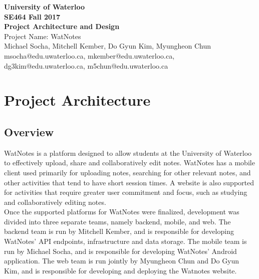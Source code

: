 \documentclass[12pt]{article}
\begin{document}
  \begin{center}
  \vspace*{\fill}
  {\Large\bf University of Waterloo}\\
  \vspace{3mm}
  {\large\bf SE464 Fall 2017}\\
  \vspace{3mm}
  {\Large\bf Project Architecture and Design}\\
  \vspace{5mm}
  {\Large Project Name: WatNotes}\\
  \vspace{5mm}
  Michael Socha, Mitchell Kember, Do Gyun Kim, Myungheon Chun\\
  \vspace{3mm}
  msocha@edu.uwaterloo.ca, mkember@edu.uwaterloo.ca, dg3kim@edu.uwaterloo.ca, m5chun@edu.uwaterloo.ca\\
  \vspace*{\fill}
  \end{center}

  \newpage

  \section{Project Architecture}
  \subsection{Overview}
    WatNotes is a platform designed to allow students at the University of Waterloo to effectively upload, share
    and collaboratively edit notes. WatNotes has a mobile client used primarily for uploading notes, searching for
    other relevant notes, and other activities that tend to have short session times.
    A website is also supported for activities that require greater user commitment and focus, such as studying and
    collaboratively editing notes. \\

    Once the supported platforms for WatNotes were finalized, development was divided into three separate teams, namely
    backend, mobile, and web. The backend team is run by Mitchell Kember, and is responsible for developing WatNotes' API
    endpoints, infrastructure and data storage. The mobile team is run by Michael Socha, and is responsible for developing
    WatNotes' Android application. The web team is run jointly by Myungheon Chun and Do Gyun Kim, and is responsible for
    developing and deploying the Watnotes website. \\
\end{document}
